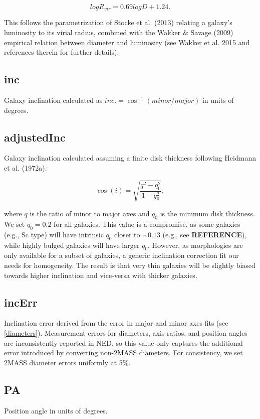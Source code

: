 \documentclass[iop]{emulateapj-rtx4}
\begin{document}
\begin{equation}
log R_{vir} = 0.69 log D + 1.24.
\end{equation}

This follows the parametrization of Stocke et al. (2013) relating a galaxy's luminosity to its virial radius, combined with the Wakker $\&$ Savage (2009) empirical relation between diameter and luminosity (see Wakker et al. 2015 and references therein for further details).

\subsection{inc}
Galaxy inclination calculated as $inc. = \cos^{-1} (minor / major)$ in units of degrees.

\subsection{adjustedInc}
Galaxy inclination calculated assuming a finite disk thickness following Heidmann et al. (1972a):

\begin{equation}
	\cos(i) = \sqrt{\frac{q^2 - q_0^2}{1 - q_0^2}},
	\label{incEq}
\end{equation}

where $q$ is the ratio of minor to major axes and $q_0$ is the minimum disk thickness. We set $q_0 = 0.2$ for all galaxies. This value is a compromise, as some galaxies (e.g., Sc type) will have intrinsic $q_0$ closer to $\sim 0.13$ (e.g., see \textbf{REFERENCE}), while highly bulged galaxies will have larger $q_0$. However, as morphologies are only available for a subset of galaxies, a generic inclination correction fit our needs for homogeneity. The result is that very thin galaxies will be slightly biased towards higher inclination and vice-versa with thicker galaxies.

\subsection{incErr}
Inclination error derived from the error in major and minor axes fits (see \ref{diameters}). Measurement errors for diameters, axis-ratios, and position angles are inconsistently reported in NED, so this value only captures the additional error introduced by converting non-2MASS diameters. For consistency, we set 2MASS diameter errors uniformly at 5\%.

\subsection{PA}
Position angle in units of degrees.
\end{document}
